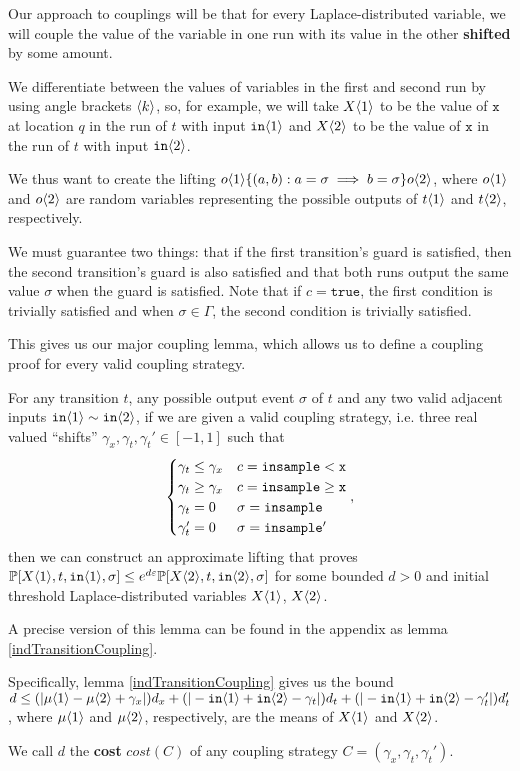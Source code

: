 Our approach to couplings will be that for every Laplace-distributed variable, we will couple the value of the variable in one run with its value in the other \textbf{shifted} by some amount. 

We differentiate between the values of variables in the first and second run by using angle brackets $\brangle{k}$, so, for example, we will take $X\brangle{1}$ to be the value of $\texttt{x}$ at location $q$ in the run of $t$ with input $\texttt{in}\brangle{1}$ and $X\brangle{2}$ to be the value of $\texttt{x}$ in the run of $t$ with input $\texttt{in}\brangle{2}$. 

We thus want to create the lifting $o\brangle{1}\{(a, b): a=\sigma\implies b=\sigma\}o\brangle{2}$, where $o\brangle{1}$ and $o\brangle{2}$ are random variables representing the possible outputs of $t\brangle{1}$ and $t\brangle{2}$, respectively.

We must guarantee two things: that if the first transition's guard is satisfied, then the second transition's guard is also satisfied and that both runs output the same value $\sigma$ when the guard is satisfied. Note that if $c = \texttt{true}$, the first condition is trivially satisfied and when $\sigma\in \Gamma$, the second condition is trivially satisfied. 

This gives us our major coupling lemma, which allows us to define a coupling proof for every valid coupling strategy.

\begin{lemma}\label{simplifiedIndTransitionCoupling}
  For any transition $t$, any possible output event $\sigma$ of $t$ and any two valid adjacent inputs $\texttt{in}\brangle{1}\sim \texttt{in}\brangle{2}$, if we are given a valid coupling strategy, i.e. three real valued ``shifts'' $\gamma_x, \gamma_t, \gamma_t'\in [-1, 1]$ such that \[
    \begin{cases}
      \gamma_t\leq\gamma_x & c = \lguard[\texttt{x}]\\
      \gamma_t\geq\gamma_x & c = \gguard[\texttt{x}]\\
      \gamma_t=0 & \sigma = \texttt{insample}\\
      \gamma_t'=0 & \sigma = \texttt{insample}'
    \end{cases},
  \]
  then we can construct an approximate lifting that proves $\PP[X\brangle{1}, t, \texttt{in}\brangle{1}, \sigma]\leq e^{d\varepsilon}\PP[X\brangle{2}, t, \texttt{in}\brangle{2}, \sigma]$ for some bounded $d>0$ and initial threshold Laplace-distributed variables $X\brangle{1}$, $X\brangle{2}$.
\end{lemma}

A precise version of this lemma can be found in the appendix as lemma \ref{indTransitionCoupling}. 

Specifically, lemma \ref{indTransitionCoupling} gives us the bound $d \leq (|\mu\brangle{1}-\mu\brangle{2}+\gamma_x|)d_x+(|-\texttt{in}\brangle{1}+\texttt{in}\brangle{2}-\gamma_t|)d_t+(|-\texttt{in}\brangle{1}+\texttt{in}\brangle{2}-\gamma_t'|)d_t'$, where $\mu\brangle{1}$ and $\mu\brangle{2}$, respectively, are the means of $X\brangle{1}$ and $X\brangle{2}$.

We call $d$ the \textbf{cost} $cost(C)$ of any coupling strategy $C = (\gamma_x, \gamma_t, \gamma_t')$.

